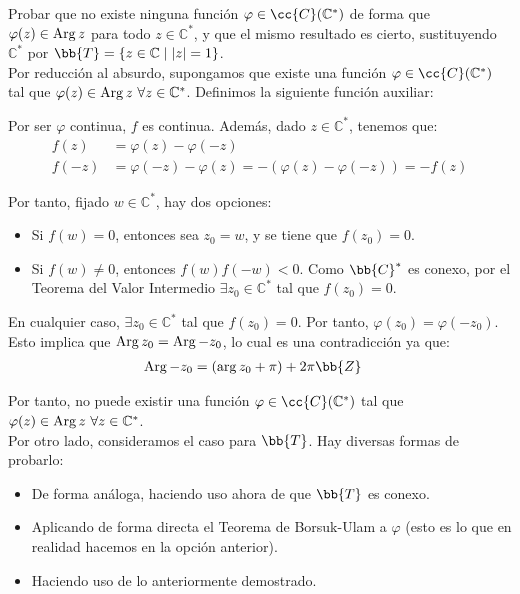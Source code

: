 \begin{ejercicio}
    Probar que no existe ninguna función $\varphi \in \cc{C}(\mathbb{C}^\ast)$ de forma que $\varphi(z) \in \operatorname{Arg} z$ para todo $z \in \mathbb{C}^\ast$, y que el mismo resultado es cierto, sustituyendo $\mathbb{C}^\ast$ por $\bb{T} = \{z \in \mathbb{C} \mid |z| = 1\}$.\\

    Por reducción al absurdo, supongamos que existe una función $\varphi\in \cc{C}(\mathbb{C}^{\ast})$ tal que $\varphi(z)\in \operatorname{Arg} z~\forall z\in \mathbb{C}^{\ast}$. Definimos la siguiente función auxiliar:

    Por ser $\varphi$ continua, $f$ es continua. Además, dado $z\in \mathbb{C}^{\ast}$, tenemos que:
    \begin{align*}
        f(z) &= \varphi(z)-\varphi(-z)\\
        f(-z) &= \varphi(-z)-\varphi(z) = -(\varphi(z)-\varphi(-z)) = -f(z)
    \end{align*}

    Por tanto, fijado $w\in \mathbb{C}^{\ast}$, hay dos opciones:
    \begin{itemize}
        \item Si $f(w)=0$, entonces sea $z_0=w$, y se tiene que $f(z_0)=0$.
        \item Si $f(w)\neq 0$, entonces $f(w)f(-w)<0$. Como $\bb{C}^{\ast}$ es conexo, por el Teorema del Valor Intermedio $\exists z_0\in \mathbb{C}^{\ast}$ tal que $f(z_0)=0$.
    \end{itemize}
    En cualquier caso, $\exists z_0\in \mathbb{C}^{\ast}$ tal que $f(z_0)=0$. Por tanto, $\varphi(z_0)=\varphi(-z_0)$. Esto implica que $\operatorname{Arg} z_0 = \operatorname{Arg} -z_0$, lo cual es una contradicción ya que:
    \begin{align*}
        \Arg -z_0 &= (\arg z_0 + \pi) + 2\pi\bb{Z}
    \end{align*}

    Por tanto, no puede existir una función $\varphi\in \cc{C}(\mathbb{C}^{\ast})$ tal que $\varphi(z)\in \operatorname{Arg} z~\forall z\in \mathbb{C}^{\ast}$.\\

    Por otro lado, consideramos el caso para $\bb{T}$. Hay diversas formas de probarlo:
    \begin{itemize}
        \item De forma análoga, haciendo uso ahora de que $\bb{T}$ es conexo.
        \item Aplicando de forma directa el Teorema de Borsuk-Ulam a $\varphi$ (esto es lo que en realidad hacemos en la opción anterior).
        \item Haciendo uso de lo anteriormente demostrado.
    \end{itemize}


\end{ejercicio}
